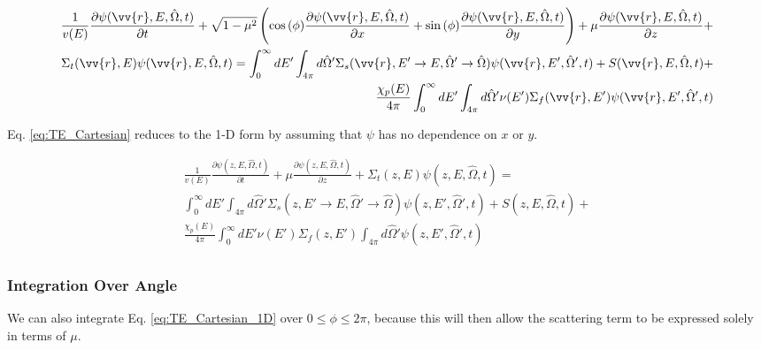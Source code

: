 \documentclass[10pt]{article}
\begin{document}
\begin{flushleft}
\begin{equation}
\label{eq:TE_Cartesian}
\begin{aligned}
\frac{1}{v(E)} \frac{\partial\psi(\vv{r}, E, \hat{\Omega},t)}{\partial t} +
 \sqrt{1-\mu^2}\left(\cos{(\phi)}\frac{\partial \psi(\vv{r}, E, \hat{\Omega},t)}{\partial x} + \sin{(\phi)} \frac{\partial \psi(\vv{r}, E, \hat{\Omega},t)}{\partial y}\right) + \mu \frac{\partial \psi(\vv{r}, E, \hat{\Omega},t)}{\partial z} +\\
 \Sigma_t(\vv{r},E)\psi(\vv{r}, E, \hat{\Omega},t) = \int_{0}^{\infty}dE' \int_{4\pi}^{ } d\hat{\Omega}' \Sigma_s(\vv{r}, E'\rightarrow E, \hat{\Omega}'\rightarrow\hat{\Omega})\psi(\vv{r}, E', \hat{\Omega}',t) + S(\vv{r}, E, \hat{\Omega}, t)+\\
 \frac{\chi_p(E)}{4\pi} \int_{0}^{\infty} dE'\int_{4\pi}^{} d\hat{\Omega}'\nu(E')\Sigma_f(\vv{r}, E')\psi(\vv{r}, E', \hat{\Omega}',t)\\
\end{aligned}
\end{equation}

Eq. \ref{eq:TE_Cartesian} reduces to the 1-D form by assuming that \(\psi\) has no dependence on \(x\) or \(y\). 

\begin{equation}
\label{eq:TE_Cartesian_1D}
\begin{aligned}
\frac{1}{v(E)} \frac{\partial\psi(z, E, \hat{\Omega},t)}{\partial t} +
 \mu \frac{\partial \psi(z, E, \hat{\Omega},t)}{\partial z} + \Sigma_t(z,E)\psi(z, E, \hat{\Omega},t) = \\
 \int_{0}^{\infty}dE' \int_{4\pi}^{ } d\hat{\Omega}' \Sigma_s(z, E'\rightarrow E, \hat{\Omega}'\rightarrow\hat{\Omega})\psi(z, E', \hat{\Omega}',t) + S(z, E, \hat{\Omega},t)+\\
 \frac{\chi_p(E)}{4\pi} \int_{0}^{\infty} dE'\nu(E')\Sigma_f(z, E')\int_{4\pi}^{} d\hat{\Omega}'\psi(z, E', \hat{\Omega}',t)\\
\end{aligned}
\end{equation}

\subsubsection{Integration Over Angle}

We can also integrate Eq. \ref{eq:TE_Cartesian_1D} over \(0\leq \phi \leq 2\pi\), because this will then allow the scattering term to be expressed solely in terms of \(\mu\). 


\end{flushleft}
\end{document}
